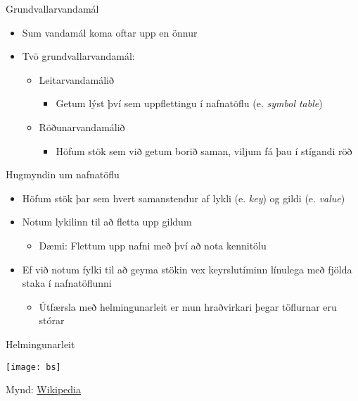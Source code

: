 \documentclass[handout]{beamer}
\begin{document}
\begin{frame}{Grundvallarvandamál}
    \begin{itemize}
        \item Sum vandamál koma oftar upp en önnur
        \item Tvö grundvallarvandamál:
        \begin{itemize}
            \item Leitarvandamálið
            \begin{itemize}
                \item Getum lýst því sem uppflettingu í nafnatöflu (e. \emph{symbol table})
            \end{itemize}
            \item Röðunarvandamálið
            \begin{itemize}
                \item Höfum stök sem við getum borið saman, viljum fá þau í stígandi röð
            \end{itemize}
        \end{itemize}
    \end{itemize}
\end{frame}

\begin{frame}{Hugmyndin um nafnatöflu}
    \begin{itemize}
        \item Höfum stök þar sem hvert samanstendur af lykli (e. \emph{key}) og gildi (e. \emph{value})
        \item Notum lykilinn til að fletta upp gildum
        \begin{itemize}
            \item Dæmi: Flettum upp nafni með því að nota kennitölu
        \end{itemize}
        \item Ef við notum fylki til að geyma stökin vex keyrslutíminn línulega með fjölda staka í nafnatöflunni
        \begin{itemize}
            \item Útfærsla með helmingunarleit er mun hraðvirkari þegar töflurnar eru stórar
        \end{itemize}
    \end{itemize}
\end{frame}

\begin{frame}{Helmingunarleit}
    \begin{center}
        \texttt{[image: bs]}

        Mynd: \href{https://upload.wikimedia.org/wikipedia/commons/thumb/6/64/Binary_search_into_array_-_example.svg/1280px-Binary_search_into_array_-_example.svg.png}{Wikipedia}
    \end{center}
\end{frame}
\end{document}
